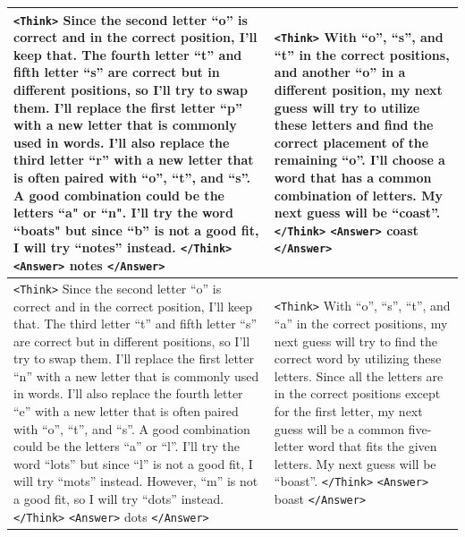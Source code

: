 \begin{table}[h]
{\begin{tabular}{|p{7cm} | p{7cm}|}
        \hline
        \texttt{<Think>} Since the second letter ``o'' is correct and in the correct position, I'll keep that. The fourth letter ``t'' and fifth letter ``s'' are correct but in different positions, so I'll try to swap them. I'll replace the first letter ``p'' with a new letter that is commonly used in words. I'll also replace the third letter ``r'' with a new letter that is often paired with ``o'', ``t'', and ``s''. A good combination could be the letters ``a" or ``n". I'll try the word ``boats" but since ``b'' is not a good fit, I will try ``notes'' instead. \texttt{</Think>} \texttt{<Answer>} notes \texttt{</Answer>} & \texttt{<Think>} With ``o'', ``s'', and ``t'' in the correct positions, and another ``o'' in a different position, my next guess will try to utilize these letters and find the correct placement of the remaining ``o''. I'll choose a word that has a common combination of letters. My next guess will be ``coast''. \texttt{</Think>} \texttt{<Answer>} coast \texttt{</Answer>} \\
        \hline
        \texttt{<Think>} Since the second letter ``o'' is correct and in the correct position, I'll keep that. The third letter ``t'' and fifth letter ``s'' are correct but in different positions, so I'll try to swap them. I'll replace the first letter ``n'' with a new letter that is commonly used in words. I'll also replace the fourth letter ``e'' with a new letter that is often paired with ``o'', ``t'', and ``s''. A good combination could be the letters ``a'' or ``l''. I'll try the word ``lots'' but since ``l'' is not a good fit, I will try ``mots'' instead. However, ``m'' is not a good fit, so I will try ``dots'' instead. \texttt{</Think>} \texttt{<Answer>} dots \texttt{</Answer>}
        & \texttt{<Think>} With ``o'', ``s'', ``t'', and ``a'' in the correct positions, my next guess will try to find the correct word by utilizing these letters. Since all the letters are in the correct positions except for the first letter, my next guess will be a common five-letter word that fits the given letters. My next guess will be ``boast''. \texttt{</Think>} \texttt{<Answer>} boast \texttt{</Answer>} \\
        \hline

\end{tabular}}
\end{table}

